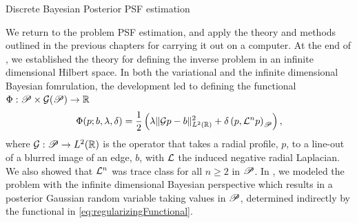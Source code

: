 
\begin{chapter}{Discrete Bayesian Posterior PSF estimation} \label{chapter:computational}

We return to the problem PSF estimation, and apply the theory and methods outlined in the previous chapters for carrying it out on a computer.
At the end of , we established the theory for defining the inverse problem in an infinite dimensional Hilbert space. 
In both the variational and the infinite dimensional Bayesian fomrulation, the development led to defining the functional $\Phi:\mathscr P \times \mathcal G(\mathscr P) \to \mathbb R$
\begin{equation} \label{eq:regularizingFunctional}
  \Phi(p; b,\lambda,\delta) = \frac 12 \left(\lambda\|\mathcal G p - b\|_{L^2(\mathbb R)}^2 + \delta\left( p, \mathcal L^n p\right)_{\mathscr P}\right),
\end{equation}
where $\mathcal G:\mathscr P \to L^2(\mathbb R)$ is the operator that takes a radial profile, $p$, to a line-out of a blurred image of an edge, $b$, with $\mathcal L$ the induced negative radial Laplacian. 
We also showed that $\mathcal L^n$ was trace class for all $n\ge2$ in $\mathscr P$. %
In , we modeled the problem with the infinite dimensional Bayesian perspective 
which results in a posterior Gaussian random variable taking values in $\mathscr P$, determined indirectly by the functional in \eqref{eq:regularizingFunctional}.


\end{chapter}

